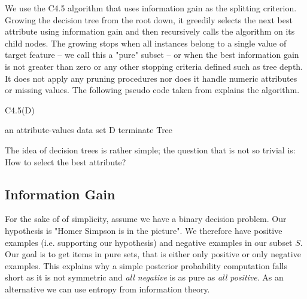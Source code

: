 \documentclass[journal, a4paper]{IEEEtran}
\begin{document}
We use the C4.5 algorithm that uses information gain as the splitting criterion. Growing the decision tree from the root down, it greedily selects the next best attribute using information gain and then recursively calls the algorithm on its child nodes. The growing stops when all instances belong to a single value of target feature -- we call this a "pure" subset -- or when the best information gain is not greater than zero or any other stopping criteria defined such as tree depth. \\ It does not apply any pruning procedures nor does it handle numeric attributes or missing values. The following pseudo code taken from \cite{pseudocode} explains the algorithm.
\begin{algorithm}
\caption{C4.5(D)}
\begin{algorithmic}
\REQUIRE an attribute-values data set D
\STATE terminate
\ENDIF
{} 
\ENDFOR
{}
\ENDFOR
\RETURN Tree
\end{algorithmic}
\end{algorithm}

The idea of decision trees is rather simple; the question that is not so trivial is: How to select the best attribute?

\subsection{Information Gain}
For the sake of of simplicity, assume we have a binary decision problem. Our hypothesis is "Homer Simpson is in the picture". We therefore have positive examples (i.e. supporting our hypothesis) and negative examples in our subset \( S \). Our goal is to get items in pure sets, that is either only positive or only negative examples. This explains why a simple posterior probability computation falls short as it is not symmetric and \textit{all negative} is as pure as \textit{all positive}. As an alternative we can use entropy from information theory.
\end{document}
